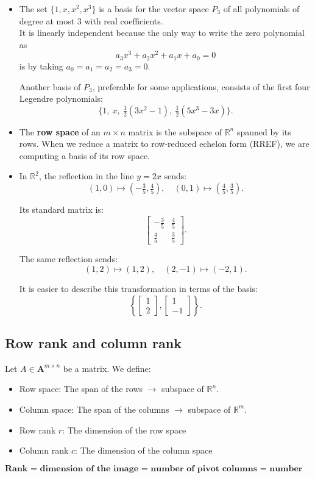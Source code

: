 \documentclass[a4paper, 9pt]{extarticle}
\begin{document}
\begin{itemize}
  \item The set $\{1, x, x^2, x^3\}$ is a basis for the vector space $P_3$ of all polynomials of degree at most 3 with real coefficients.\\

        It is linearly independent because the only way to write the zero polynomial as
        $$
          a_3 x^3 + a_2 x^2 + a_1 x + a_0 = 0
        $$
        is by taking $a_0 = a_1 = a_2 = a_3 = 0$.

        Another basis of $P_3$, preferable for some applications, consists of the first four Legendre polynomials:
        $$
          \{1,\ x,\ \tfrac{1}{2}(3x^2 - 1),\ \tfrac{1}{2}(5x^3 - 3x)\}.
        $$
  \item The \textbf{row space} of an $m \times n$ matrix is the subspace of $\mathbb{R}^n$ spanned by its rows. When we reduce a matrix to row-reduced echelon form (RREF), we are computing a basis of its row space.
  \item In $\mathbb{R}^2$, the reflection in the line $y = 2x$ sends:
        \[
          (1,0) \mapsto \left(-\tfrac{3}{5}, \tfrac{4}{5}\right), \quad
          (0,1) \mapsto \left(\tfrac{4}{5}, \tfrac{3}{5}\right).
        \]

        Its standard matrix is:
        \[
          \begin{bmatrix}
            - \tfrac{3}{5} & \tfrac{4}{5} \\
            \tfrac{4}{5}   & \tfrac{3}{5}
          \end{bmatrix}.
        \]

        The same reflection sends:
        \[
          (1,2) \mapsto (1,2), \quad
          (2, -1) \mapsto (-2,1).
        \]

        It is easier to describe this transformation in terms of the basis:
        \[
          \left\{
          \begin{bmatrix}
            1 \\ 2
          \end{bmatrix},
          \begin{bmatrix}
            1 \\ -1
          \end{bmatrix}
          \right\}.
        \]
\end{itemize}

\subsection{Row rank and column rank}
Let $A \in \mathbf{A}^{m \times n}$ be a matrix. We define:
\begin{itemize}
  \item Row space: The span of the rows $\rightarrow$ subspace of $\mathbb{R}^n$.
  \item Column space: The span of the columns $\rightarrow$ subspace of $\mathbb{R}^m$.
  \item Row rank $r$: The dimension of the row space
  \item Column rank $c$: The dimension of the column space
\end{itemize}
$$\textbf{Rank = dimension of the image = number of pivot columns = number of nonzero rows in RREF.}$$
\end{document}
